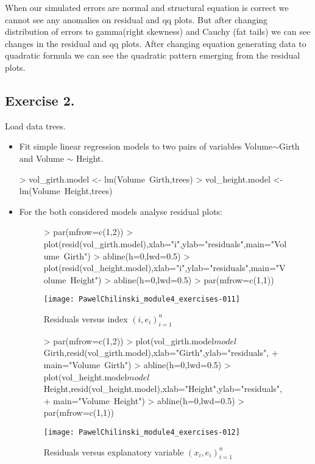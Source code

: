\documentclass[a4paper]{article}
\begin{document}
When our simulated errors are normal and structural equation is correct we
cannot see any anomalies on residual and qq plots. But after changing
distribution of errors to gamma(right skewness) and Cauchy (fat tails) we can
see changes in the residual and qq plots. After changing equation generating
data to quadratic formula we can see the quadratic pattern emerging from the
residual plots.

\subsection{Exercise 2.} Load data trees.
\begin{itemize}
\item Fit simple linear regression models to two pairs of variables
Volume$\sim$Girth and Volume $\sim$ Height.
\begin{Schunk}
\begin{Sinput}
> vol_girth.model <- lm(Volume~Girth,trees)
> vol_height.model <- lm(Volume~Height,trees)
\end{Sinput}
\end{Schunk}

\item For the both considered models analyse residual plots:

\begin{figure}[H]
\begin{center}
\begin{Schunk}
\begin{Sinput}
> par(mfrow=c(1,2))
> plot(resid(vol_girth.model),xlab="i",ylab="residuals",main="Volume~Girth")
> abline(h=0,lwd=0.5)
> plot(resid(vol_height.model),xlab="i",ylab="residuals",main="Volume~Height")
> abline(h=0,lwd=0.5)
> par(mfrow=c(1,1))	
\end{Sinput}
\end{Schunk}
\texttt{[image: PawelChilinski\_module4\_exercises-011]}
\caption{Residuals versus index ${(i,e_i)}_{i=1}^n$}
\end{center}
\end{figure}

\begin{figure}[H]
\begin{center}
\begin{Schunk}
\begin{Sinput}
> par(mfrow=c(1,2))
> plot(vol_girth.model$model$Girth,resid(vol_girth.model),xlab="Girth",ylab="residuals",
+ 		main="Volume~Girth")
> abline(h=0,lwd=0.5)
> plot(vol_height.model$model$Height,resid(vol_height.model),xlab="Height",ylab="residuals",
+ 		main="Volume~Height")
> abline(h=0,lwd=0.5)
> par(mfrow=c(1,1))	
\end{Sinput}
\end{Schunk}
\texttt{[image: PawelChilinski\_module4\_exercises-012]}
\caption{Residuals versus explanatory variable ${(x_i,e_i)}_{i=1}^n$}
\end{center}
\end{figure}


\end{itemize}
\end{document}
